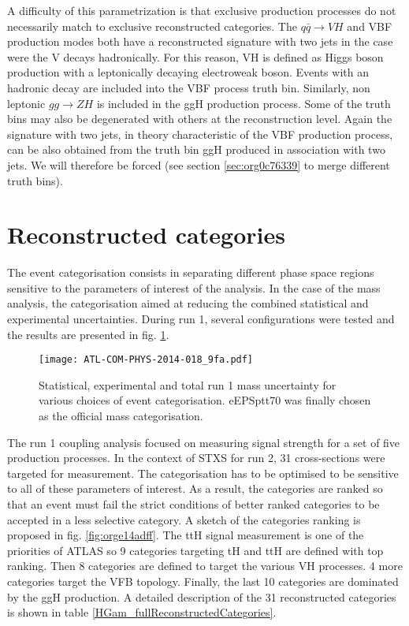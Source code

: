 \begin{enumerate}
A difficulty of this parametrization is that exclusive production processes do not necessarily match to exclusive reconstructed categories.
The \(q\bar{q}\rightarrow VH\) and VBF production modes both have a reconstructed signature with two jets in the case were the V decays hadronically.
For this reason, VH is defined as Higgs boson production with a leptonically decaying electroweak boson.
Events with an hadronic decay are included into the VBF process truth bin.
Similarly, non leptonic \(gg\rightarrow ZH\) is included in the ggH production process.
Some of the truth bins may also be degenerated with others at the reconstruction level.
Again the signature with two jets, in theory characteristic of the VBF production process, can be also obtained from the truth bin ggH produced in association with two jets.
We will therefore be forced (see section \ref{sec:org0c76339} to merge different truth bins).
\end{enumerate}



\section{Reconstructed categories}
\label{sec:orgdbf5aa8}
\label{HGam_RecCateg}
The event categorisation consists in separating different phase space regions sensitive to the parameters of interest of the analysis.
In the case of the mass analysis, the categorisation aimed at reducing the combined statistical and experimental uncertainties.
During run 1, several configurations were tested and the results are presented in fig. \ref{fig:org9ced173}.

\begin{figure}[htbp]
\centering
\texttt{[image: ATL-COM-PHYS-2014-018\_9fa.pdf]}
\caption{\label{fig:org9ced173}
  Statistical, experimental and total run 1 mass uncertainty for various choices of event categorisation.
  eEPSptt70 was finally chosen as the official mass categorisation.
  \cite{ATL-COM-PHYS-2014-018}}
\end{figure}


The run 1 coupling analysis focused on measuring signal strength for a set of five production processes.
In the context of STXS for run 2, 31 cross-sections were targeted for measurement.
The categorisation has to be optimised to be sensitive to all of these parameters of interest.
As a result, the categories are ranked so that an event must fail the strict conditions of better ranked categories to be accepted in a less selective category.
A sketch of the categories ranking is proposed in fig. \ref{fig:orge14adff}.
The ttH signal measurement is one of the priorities of ATLAS so 9 categories targeting tH and ttH are defined with top ranking.
Then 8 categories are defined to target the various VH processes.
4 more categories target the VFB topology.
Finally, the last 10 categories are dominated by the ggH production.
A detailed description of the 31 reconstructed categories is shown in table \ref{HGam_fullReconstructedCategories}.

